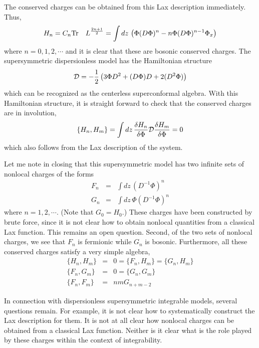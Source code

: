 \documentclass[a4paper,11pt]{article}
\begin{document}
The conserved charges can be obtained from this Lax description
immediately. Thus,
\begin{equation}
H_{n} = C_{n} {\rm Tr}\quad L^{2n+1\over 2} = \int
dz\,\left(\Phi(D\Phi)^{n} - n\Phi (D\Phi)^{n-1} \Phi_{x}\right)
\end{equation}
where $n=0,1,2,\cdots$ and it is clear that these are bosonic
conserved charges. The supersymmetric dispersionless model has the
Hamiltonian structure
\begin{equation}
{\cal D} = -{1\over 2} \left(3 \Phi D^{2} + (D\Phi) D + 2
(D^{2}\Phi)\right)
\end{equation}
which can be recognized as the centerless superconformal algebra. With
this Hamiltonian structure, it is straight forward to check that the
conserved charges are in involution,
\begin{equation}
\{H_{n},H_{m}\} = \int dz\,{\delta H_{n}\over \delta \Phi} {\cal D}
{\delta H_{m}\over \delta \Phi} = 0
\end{equation}
which also follows from the Lax description of the system.

Let me note in closing that this supersymmetric model has two infinite
sets of nonlocal charges of the forms
\begin{eqnarray}
F_{n} & = & \int dz\, (D^{-1}\Phi)^{n}\nonumber\\
G_{n} & = & \int dz\,\Phi (D^{-1}\Phi)^{n}
\end{eqnarray}
where $n =1,2,\cdots$. (Note that $G_{0} = H_{0}$.) These charges have
been constructed by brute force, since it is not clear how to obtain
nonlocal quantities from a classical Lax function. This remains an
open question. Second, of the two sets of nonlocal charges, we see
that $F_{n}$ is fermionic while $G_{n}$ is bosonic. Furthermore, all
these conserved charges satisfy a very simple algebra,
\begin{eqnarray}
\{H_{n}, H_{m}\} & = & 0 = \{F_{n},H_{m}\} =
\{G_{n},H_{m}\}\nonumber\\
\{F_{n},G_{m}\} & = & 0 = \{G_{n},G_{m}\}\nonumber\\
\{F_{n},F_{m}\} & = & nm G_{n+m-2}
\end{eqnarray}

In connection with dispersionless supersymmetric integrable models,
several questions remain. For example, it is not clear how to
systematically construct the Lax description for them. It is not at
all clear how nonlocal charges can be obtained from a classical Lax
function. Neither is it clear what is the role played by these charges
within the context of integrability.
\end{document}
